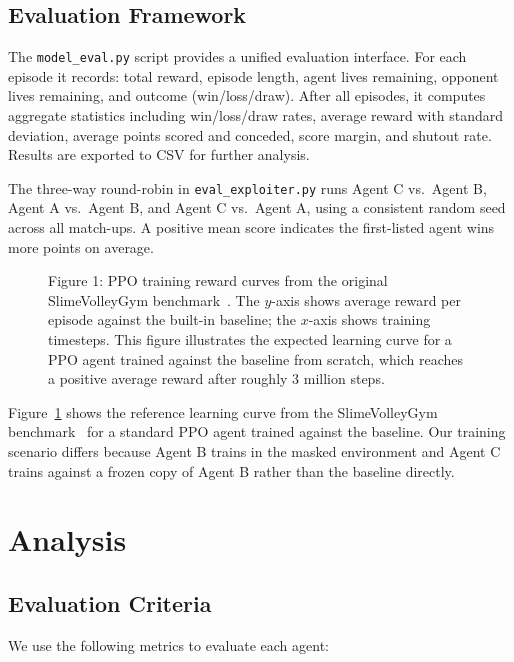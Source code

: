 \documentclass[conference]{IEEEtran}
\begin{document}
\subsection{Evaluation Framework}

The \texttt{model\_eval.py} script provides a unified evaluation interface. For each episode it records: total reward, episode length, agent lives remaining, opponent lives remaining, and outcome (win/loss/draw). After all episodes, it computes aggregate statistics including win/loss/draw rates, average reward with standard deviation, average points scored and conceded, score margin, and shutout rate. Results are exported to CSV for further analysis.

The three-way round-robin in \texttt{eval\_exploiter.py} runs Agent C vs.\ Agent B, Agent A vs.\ Agent B, and Agent C vs.\ Agent A, using a consistent random seed across all match-ups. A positive mean score indicates the first-listed agent wins more points on average.

\begin{figure}[thpb]
    \centering
    
    \caption{Figure 1: PPO training reward curves from the original SlimeVolleyGym benchmark~\cite{slimevolleygym}. The $y$-axis shows average reward per episode against the built-in baseline; the $x$-axis shows training timesteps. This figure illustrates the expected learning curve for a PPO agent trained against the baseline from scratch, which reaches a positive average reward after roughly 3 million steps.}
    \label{fig:ppo_results}
\end{figure}

Figure~\ref{fig:ppo_results} shows the reference learning curve from the SlimeVolleyGym benchmark~\cite{slimevolleygym} for a standard PPO agent trained against the baseline. Our training scenario differs because Agent B trains in the masked environment and Agent C trains against a frozen copy of Agent B rather than the baseline directly.


\section{Analysis}

\subsection{Evaluation Criteria}

We use the following metrics to evaluate each agent:
\end{document}
